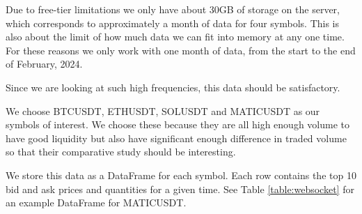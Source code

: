 \documentclass[a4paper, oneside, notitlepage]{book}
\begin{document}
Due to free-tier limitations we only have about 30GB of storage on the server,
which corresponds to approximately a month of data for four symbols. 
This is also about the limit of how much data we can fit into memory at any one time. For these reasons
we only work with one month of data, from the start to the end of February, 2024.

Since we are looking at such high frequencies, this data should be satisfactory.

We choose BTCUSDT, ETHUSDT, SOLUSDT and MATICUSDT as our symbols of interest. We choose
these because they are all high enough volume to have good liquidity but also have significant
enough difference in traded volume so that their comparative study should be interesting.

We store this data as a DataFrame for each symbol. Each row contains the top 10 bid and ask prices and quantities
for a given time. See Table \ref{table:websocket} for an example DataFrame for MATICUSDT. 
\end{document}
